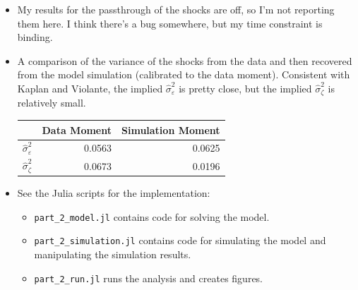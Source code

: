 \documentclass{article}
\begin{document}
\begin{itemize}
\item My results for the passthrough of the shocks are off, so I'm not reporting them here. I think there's a bug somewhere, but my time constraint is binding.

\item A comparison of the variance of the shocks from the data and then recovered from the model simulation (calibrated to the data moment).  Consistent with Kaplan and Violante, the implied $\hat{\sigma}_\varepsilon^2$ is pretty close, but the implied $\hat{\sigma}_\zeta^2$ is relatively small.

\begin{center}
\begin{tabular}{ l | r | r}
                              & Data Moment   & Simulation Moment \\  
\hline
$\hat{\sigma}_\varepsilon^2$  & 0.0563 & 0.0625 \\  
$\hat{\sigma}_\zeta^2$        & 0.0673 & 0.0196
\end{tabular}
\end{center}

\item See the Julia scripts for the implementation:

\begin{itemize}
\item \texttt{part\_2\_model.jl} contains code for solving the model.
\item \texttt{part\_2\_simulation.jl} contains code for simulating the model and manipulating the simulation results.
\item \texttt{part\_2\_run.jl} runs the analysis and creates figures.
\end{itemize}

\end{itemize}
\end{document}
